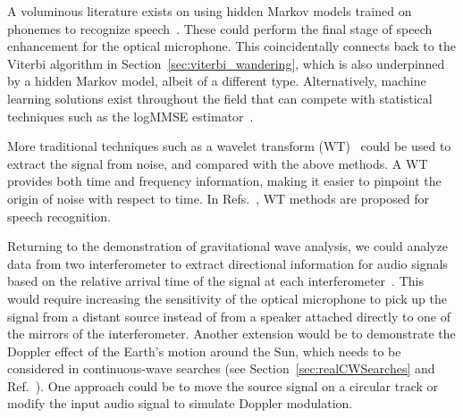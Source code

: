 \documentclass[paper-main.tex]{subfiles}
\begin{document}
A voluminous literature exists on using hidden Markov models trained on phonemes to recognize speech~\cite{HMM_english}. 
These could perform the final stage of speech enhancement for the optical microphone. 
This coincidentally connects back to the Viterbi algorithm in Section~\ref{sec:viterbi_wandering}, which is also underpinned by a hidden Markov model, albeit of a different type. Alternatively, machine learning solutions exist throughout the field that can compete with statistical techniques such as the logMMSE estimator~\cite{SEGAN}.


More traditional techniques such as a wavelet transform (WT)~\citep{nason1995stationary} could be used to extract the signal from noise, and compared with the above methods. 
A WT provides both time and frequency information, making it easier to pinpoint the origin of noise with respect to time. 
In Refs.~\cite{tufekci2000feature,agbinya1996discrete}, WT methods are proposed for speech recognition. 


Returning to the demonstration of gravitational wave analysis, we could analyze data from two interferometer to extract directional information for audio signals based on the relative arrival time of the signal at each interferometer~\cite{GW150914}.
This would require increasing the sensitivity of the optical microphone to pick up the signal from a distant source instead of from a speaker attached directly to one of the mirrors of the interferometer.
Another extension would be to demonstrate the Doppler effect of the Earth's motion around the Sun, which needs to be considered in continuous-wave searches (see Section~\ref{sec:realCWSearches} and Ref.~\cite{JKS:1998}). 
One approach could be to move the source signal on a circular track or modify the input audio signal to simulate Doppler modulation. 
\end{document}
